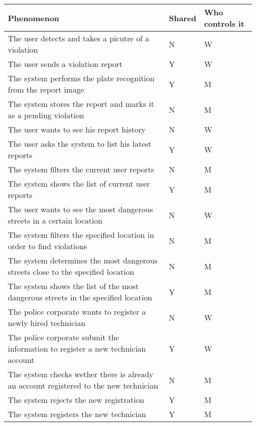 \begin{longtable}{| p{} | p{} | p{} |} 
      \hline
      Phenomenon & Shared & Who controls it \\
      \hline
      
      The user detects and takes a picutre of a violation & N & W\\
      \hline
      The user sends a violation report & Y & W\\
      \hline
      The system performs the plate recognition from the report image & Y & M\\
      \hline
      The system stores the report and marks it as a pending violation& N & M\\
      \hline
      
      The user wants to see his report history & N & W\\
      \hline
      The user asks the system to list his latest reports & Y & W\\
      \hline
      The system filters the current user reports& N & M\\
      \hline
      The system shows the list of current user reports& Y & M\\
      \hline
      
      The user wants to see the most dangerous streets in a certain location& N & W\\
      \hline
      The system filters the specified location in order to find violations& N & M\\
      \hline
      The system determines the most dangerous streets close to the specified location& N & M\\
      \hline
      The system shows the list of the most dangerous streets in the specified location& Y & M\\
      \hline
      
      The police corporate wants to register a newly hired technician& N & W\\
      \hline
      The police corporate submit the information to register a new technician account& Y & W\\
      \hline
      The system checks wether there is already an account registered to the new technician & N & M\\
      \hline
      The system rejects the new registration & Y & M\\
      \hline
      The system registers the new technician & Y & M\\
      \hline


\end{longtable}
